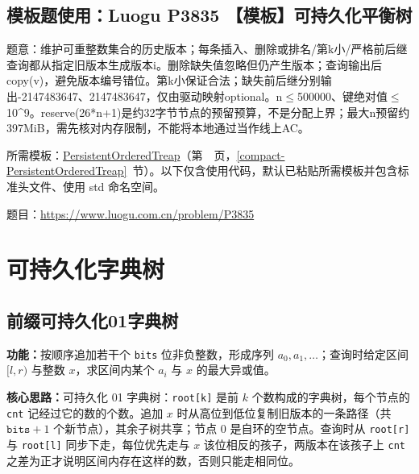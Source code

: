 \Needspace{525pt}

\subsection*{模板题使用：Luogu P3835 【模板】可持久化平衡树}

\label{usage-example-199}

题意：维护可重整数集合的历史版本；每条插入、删除或排名/第k小/严格前后继查询都从指定旧版本生成版本i。删除缺失值忽略但仍产生版本；查询输出后copy(v)，避免版本编号错位。第k小保证合法；缺失前后继分别输出-2147483647、2147483647，仅由驱动映射optional。n$\le$500000、键绝对值$\le$10\textasciicircum{}9。reserve(26*n+1)是约32字节节点的预留预算，不是分配上界；最大n预留约397MiB，需先核对内存限制，不能将本地通过当作线上AC。

所需模板：\hyperref[compact-PersistentOrderedTreap]{PersistentOrderedTreap}（第~\pageref{compact-PersistentOrderedTreap}~页，\ref{compact-PersistentOrderedTreap}~节）。以下仅含使用代码，默认已粘贴所需模板并包含标准头文件、使用 std 命名空间。

题目：\url{https://www.luogu.com.cn/problem/P3835}



\newpage

\Needspace{610pt}

\section{可持久化字典树}

\subsection{前缀可持久化01字典树}\label{compact-PersistentXorTrie}

\noindent\textbf{功能：}\allowbreak 按顺序追加若干个 \texttt{bits} 位非负整数，形成序列 $a_0,a_1,\dots$；查询时给定区间 $[l,r)$ 与整数 $x$，求区间内某个 $a_i$ 与 $x$ 的最大异或值。

\textbf{核心思路：}\allowbreak 可持久化 01 字典树：\texttt{root[k]} 是前 $k$ 个数构成的字典树，每个节点的 \texttt{cnt} 记经过它的数的个数。追加 $x$ 时从高位到低位复制旧版本的一条路径（共 $\texttt{bits}+1$ 个新节点），其余子树共享；节点 0 是自环的空节点。查询时从 \texttt{root[r]} 与 \texttt{root[l]} 同步下走，每位优先走与 $x$ 该位相反的孩子，两版本在该孩子上 \texttt{cnt} 之差为正才说明区间内存在这样的数，否则只能走相同位。



